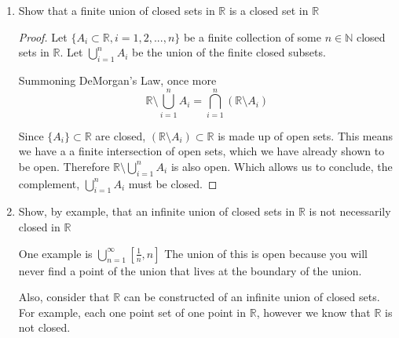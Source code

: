 \documentclass{tufte-book}
\theoremstyle{mytheoremstyle}
\theoremstyle{mylemstyle}
\theoremstyle{mydefstyle}
\begin{document}
\begin{enumerate}
\begin{proof}
Let $\{A_i \subset \mathbb{R}, i \in I\}$ be an arbitrary collection of closed sets.   Let $\bigcap\limits_{i \in I} A_i$ be the intersection of the closed sets.  If this intersection is $\emptyset$ we are done.  Supposing it is not, we'll continue.

By definition $\mathbb{R} \setminus \bigcap\limits_{i \in I} A_i = \bigcup\limits_{i \in I} (\mathbb{R} \setminus A_i)$.

Since $\{A_i\} \subset \mathbb{R}$ are closed, $(\mathbb{R} \setminus A_i) \subset \mathbb{R}$ is made up of open sets.  So we have an arbitrary union of open sets in $\mathbb{R}$ which we have already shown to be open.  This means  $\mathbb{R} \setminus \bigcap\limits_{i \in I} A_i$ is also open.  Therefore it's compliment $\bigcap\limits_{i \in I}A_i$ is closed.

\end{proof}

\item Show that a finite union of closed sets in $\mathbb{R}$ is a closed set in $\mathbb{R}$ 
\begin{proof}

Let $\{A_i \subset \mathbb{R}, i=1, 2,...,n\}$ be a finite collection of some $n \in \mathbb{N}$ closed sets in $\mathbb{R}$.  Let $\bigcup\limits_{i=1}^{n}A_i$ be the union of the finite closed subsets.

Summoning DeMorgan's Law, once more
\[\mathbb{R} \setminus \bigcup\limits_{i=1}^{n} A_i = \bigcap\limits_{i=1}^{n}(\mathbb{R} \setminus A_i)\]

Since $\{A_i\} \subset \mathbb{R}$ are closed, $(\mathbb{R} \setminus A_i) \subset \mathbb{R}$ is made up of open sets.  This means we have a a finite intersection of open sets, which we have already shown to be open.  Therefore $\mathbb{R} \setminus \bigcup\limits_{i=1}^{n} A_i $ is also open.  Which allows us to conclude, the complement,  $\bigcup\limits_{i=1}^{n} A_i $ must be closed.

\end{proof}

\item Show, by example, that an infinite union of closed sets in $\mathbb{R}$ is not necessarily closed in $\mathbb{R}$

One example is $\bigcup\limits_{n=1}^{\infty}[\frac{1}{n}, n]$  The union of this is open because you will never find a point of the union that lives at the boundary of the union.

Also, consider that $\mathbb{R}$ can be constructed of an infinite union of closed sets.   For example, each one point set of one point in $\mathbb{R}$, however we know that $\mathbb{R}$ is not closed.
\end{enumerate}
\end{document}
